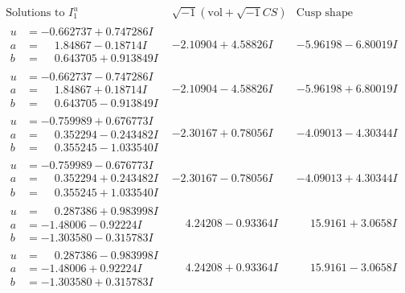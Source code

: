 \documentclass[1p]{elsarticle_modified}
\theoremstyle{definition}
\newcommand{\I}{\sqrt{-1}}
\begin{document}
$$\begin{array}{c|c|c}  
\text{Solutions to }I^u_{1}& \I (\text{vol} + \sqrt{-1}CS) & \text{Cusp shape}\\
 \hline 
\begin{aligned}
u &= -0.662737 + 0.747286 I \\
a &= \phantom{-}1.84867 - 0.18714 I \\
b &= \phantom{-}0.643705 + 0.913849 I\end{aligned}
 & -2.10904 + 4.58826 I & -5.96198 - 6.80019 I \\ \hline\begin{aligned}
u &= -0.662737 - 0.747286 I \\
a &= \phantom{-}1.84867 + 0.18714 I \\
b &= \phantom{-}0.643705 - 0.913849 I\end{aligned}
 & -2.10904 - 4.58826 I & -5.96198 + 6.80019 I \\ \hline\begin{aligned}
u &= -0.759989 + 0.676773 I \\
a &= \phantom{-}0.352294 - 0.243482 I \\
b &= \phantom{-}0.355245 - 1.033540 I\end{aligned}
 & -2.30167 + 0.78056 I & -4.09013 - 4.30344 I \\ \hline\begin{aligned}
u &= -0.759989 - 0.676773 I \\
a &= \phantom{-}0.352294 + 0.243482 I \\
b &= \phantom{-}0.355245 + 1.033540 I\end{aligned}
 & -2.30167 - 0.78056 I & -4.09013 + 4.30344 I \\ \hline\begin{aligned}
u &= \phantom{-}0.287386 + 0.983998 I \\
a &= -1.48006 - 0.92224 I \\
b &= -1.303580 - 0.315783 I\end{aligned}
 & \phantom{-}4.24208 - 0.93364 I & \phantom{-}15.9161 + 3.0658 I \\ \hline\begin{aligned}
u &= \phantom{-}0.287386 - 0.983998 I \\
a &= -1.48006 + 0.92224 I \\
b &= -1.303580 + 0.315783 I\end{aligned}
 & \phantom{-}4.24208 + 0.93364 I & \phantom{-}15.9161 - 3.0658 I \\ \hline\begin{aligned}

\end{aligned}
\end{array}$$
\end{document}

